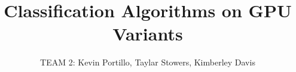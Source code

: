 \documentclass[12pt]{article}
\begin{document}
\title{Classification Algorithms on GPU Variants}
\author{TEAM 2: Kevin Portillo, Taylar Stowers, Kimberley Davis}
\maketitle




\end{document}
